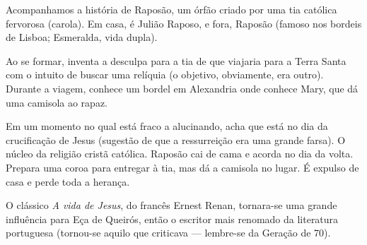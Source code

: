Acompanhamos a história de Raposão, um órfão criado por uma tia católica fervorosa (carola). Em casa, é Julião Raposo, e fora, Raposão (famoso nos bordeis de Lisboa; Esmeralda, vida dupla).

Ao se formar, inventa a desculpa para a tia de que viajaria para a Terra Santa com o intuito de buscar uma relíquia (o objetivo, obviamente, era outro). Durante a viagem, conhece um bordel em Alexandria onde conhece Mary, que dá uma camisola ao rapaz.

Em um momento no qual está fraco a alucinando, acha que está no dia da crucificação de Jesus (sugestão de que a ressurreição era uma grande farsa). O núcleo da religião cristã católica. Raposão cai de cama e acorda no dia da volta. Prepara uma coroa para entregar à tia, mas dá a camisola no lugar. É expulso de casa e perde toda a herança.

O clássico \textit{A vida de Jesus}, do francês Ernest Renan, tornara-se uma grande influência para Eça de Queirós, então o escritor mais renomado da literatura portuguesa (tornou-se aquilo que criticava — lembre-se da Geração de 70).